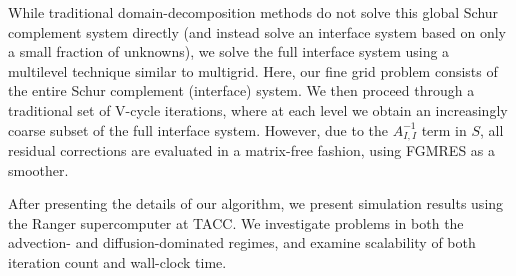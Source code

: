 \documentclass{report}
\begin{document}
While traditional domain-decomposition methods do not solve this
global Schur complement system directly (and instead solve an
interface system based on only a small fraction of unknowns), we solve
the full interface system using a multilevel technique similar to
multigrid. Here, our fine grid problem consists of the entire
Schur complement (interface) system. We then proceed through a
traditional set of V-cycle iterations, where at each level we obtain
an increasingly coarse subset of the full interface system. However,
due to the $A^{-1}_{I,I}$ term in $S$, all residual corrections are
evaluated in a matrix-free fashion, using FGMRES as a smoother.

After presenting the details of our algorithm, we present simulation
results using the Ranger supercomputer at TACC. We investigate
problems in both the advection- and diffusion-dominated regimes, and
examine scalability of both iteration count and wall-clock time.
\end{document}
